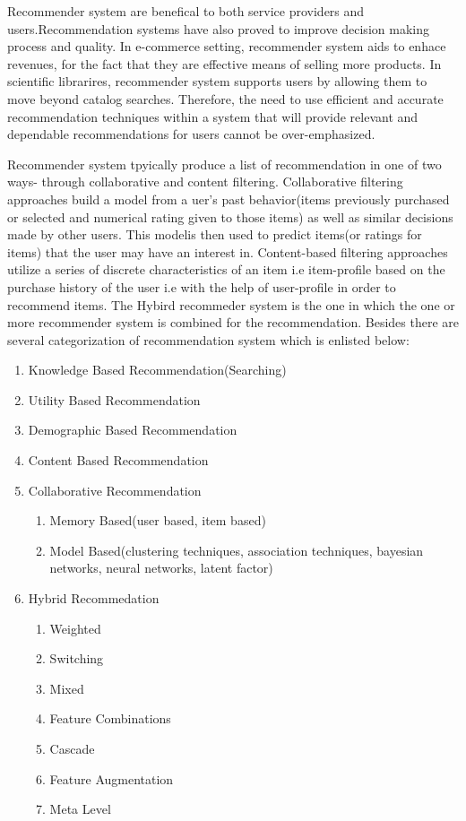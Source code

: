Recommender system are benefical to both service providers and users.Recommendation systems have also proved to improve decision making process and quality. In e-commerce setting, recommender system aids to enhace revenues, for the fact that they are effective means of selling more products. In scientific librarires, recommender system supports users by allowing them to move beyond catalog searches. Therefore, the need to use efficient and accurate recommendation techniques within a system that will provide relevant and dependable recommendations for users cannot be over-emphasized.

Recommender system tpyically produce a list of recommendation in one of two ways- through collaborative and content filtering. Collaborative filtering approaches build a model from a uer's past behavior(items previously purchased or selected and numerical rating given to those items) as well as similar decisions made by other users. This modelis then used to predict items(or ratings for items) that the user may have an interest in. Content-based filtering approaches utilize a series of discrete characteristics of an item i.e item-profile based on the purchase history of the user i.e with the help of user-profile in order to recommend items. The Hybird recommeder system is the one in which the one or more recommender system is combined for the recommendation. Besides there are several categorization of recommendation system which is enlisted below:
\begin{enumerate}
	\item Knowledge Based Recommendation(Searching)
	\item Utility Based Recommendation
	\item Demographic Based Recommendation
	\item Content Based Recommendation
	\item Collaborative Recommendation
		\begin{enumerate}
			\item Memory Based(user based, item based)
			\item Model Based(clustering techniques, association techniques, bayesian networks, neural networks, latent factor)
		\end{enumerate}
	\item Hybrid Recommedation
		\begin{enumerate}
			\item Weighted
			\item Switching
			\item Mixed
			\item Feature Combinations
			\item Cascade
			\item Feature Augmentation
			\item Meta Level
		\end{enumerate}
\end{enumerate}
